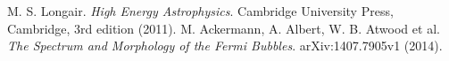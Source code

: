 \documentclass[a4paper]{article}
\begin{document}
\newpage
\begin{thebibliography}{9}
	 M. S. Longair. \textit{High Energy Astrophysics}. Cambridge University Press, Cambridge, 3rd edition (2011).
	 M. Ackermann, A. Albert, W. B. Atwood et al. \textit{The Spectrum and Morphology of the \textit{Fermi} Bubbles}. arXiv:1407.7905v1 (2014).\\
\end{thebibliography}
\end{document}
